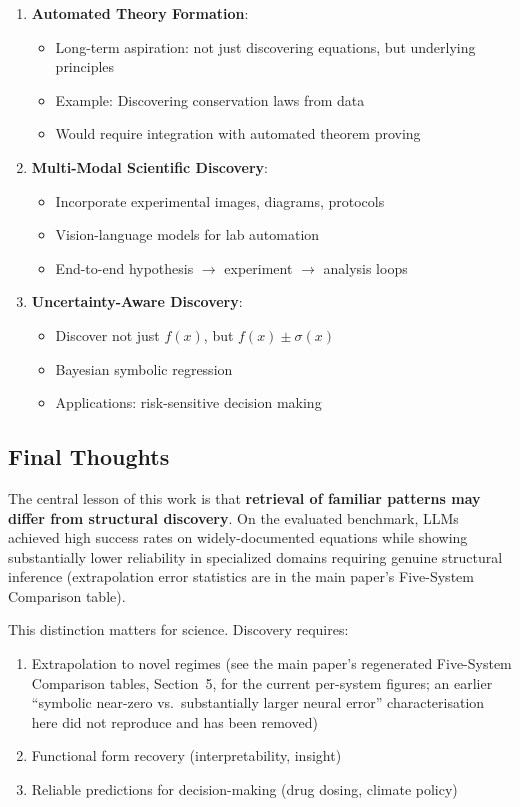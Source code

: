 \documentclass[twoside,11pt]{article}
\begin{document}
\begin{enumerate}
\item \textbf{Automated Theory Formation}:
   \begin{itemize}
   \item Long-term aspiration: not just discovering equations, but underlying principles
   \item Example: Discovering conservation laws from data
   \item Would require integration with automated theorem proving
   \end{itemize}

\item \textbf{Multi-Modal Scientific Discovery}:
   \begin{itemize}
   \item Incorporate experimental images, diagrams, protocols
   \item Vision-language models for lab automation
   \item End-to-end hypothesis $\to$ experiment $\to$ analysis loops
   \end{itemize}

\item \textbf{Uncertainty-Aware Discovery}:
   \begin{itemize}
   \item Discover not just $f(x)$, but $f(x) \pm \sigma(x)$
   \item Bayesian symbolic regression
   \item Applications: risk-sensitive decision making
   \end{itemize}
\end{enumerate}

\subsection{Final Thoughts}

The central lesson of this work is that \textbf{retrieval of familiar patterns may differ from structural discovery}\citep{kambhampati2024llms}. On the evaluated benchmark, LLMs achieved high success rates on widely-documented equations while showing substantially lower reliability in specialized domains requiring genuine structural inference (extrapolation error statistics are in the main paper's Five-System Comparison table).

This distinction matters for science. Discovery requires:
\begin{enumerate}
\item Extrapolation to novel regimes (see the main paper's regenerated Five-System Comparison tables, Section~5, for the current per-system figures; an earlier ``symbolic near-zero vs.\ substantially larger neural error'' characterisation here did not reproduce and has been removed)
\item Functional form recovery (interpretability, insight)
\item Reliable predictions for decision-making (drug dosing, climate policy)
\end{enumerate}
\end{document}
